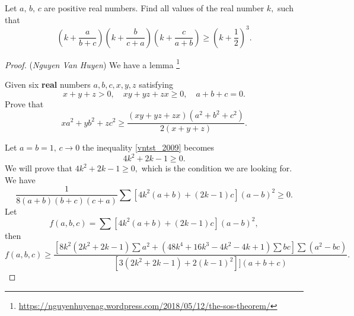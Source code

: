 \documentclass[12pt,a4paper]{book}
\begin{document}
\begin{pro_no_count}
Let $a,\,b,\,c$ are positive real numbers. Find all values of the real number $k,$ such that
\begin{equation}\label{vntst_2009}
\left(k+\frac{a}{b+c}\right) \left(k+\frac{b}{c+a}\right) \left(k+\frac{c}{a+b}\right) \geqslant \left(k+\frac{1}{2}\right)^3.
\end{equation}
\end{pro_no_count}

\begin{proof}
(\textit{Nguyen Van Huyen}) We have a lemma \footnote{\url{https://nguyenhuyenag.wordpress.com/2018/05/12/the-sos-theorem/}}

\begin{lemma}
Given six \textbf{real} numbers $a, b, c, x, y, z$ satisfying
$$x+y+z>0, \quad x y+y z+z x \geqslant 0, \quad a+b+c=0.$$
Prove that
\[xa^2+yb^2+zc^2 \ge \frac{(xy+yz+zx)(a^2+b^2+c^2)}{2(x+y+z)}.\]
\end{lemma}

Let $a=b=1,\,c \to 0$ the inequality \eqref{vntst_2009} becomes 
$$4k^2+2k-1 \geqslant 0.$$ 
We will prove that $4k^2+2k-1 \geqslant 0,$ which is the condition we are looking for.
We have
\[\frac{1}{8(a+b)(b+c)(c+a)} \sum [4k^2(a+b) + (2k-1)c](a-b)^2 \ge 0.\]
Let
\[f(a,b,c) = \sum [4k^2(a+b) + (2k-1)c](a-b)^2,\]
then
\[f(a,b,c) \ge \frac{\displaystyle \left[8k^2(2k^2+2k-1) \sum a^2 +(48k^4+16k^3-4k^2-4k+1) \sum bc\right]\sum (a^2 - bc)}{[3(2k^2+2k-1)+2(k-1)^2]](a+b+c)}.\]
%
%
%
%
%
%
%
%
\end{proof}
\end{document}
